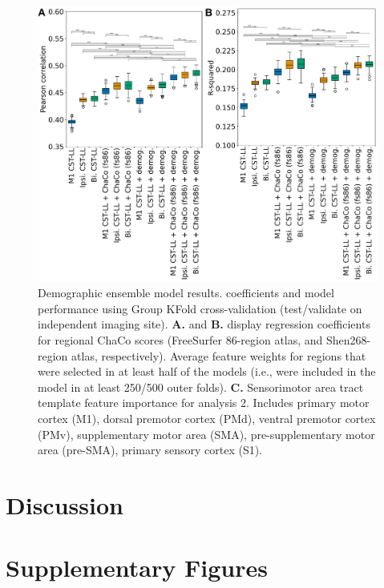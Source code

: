 \documentclass[10pt]{article}
\begin{document}
\begin{figure}[htp]
\centering
\includegraphics[width=1\linewidth]{figures/Analysis8.png}
\caption{Demographic ensemble model results. coefficients and model performance using Group KFold cross-validation (test/validate on independent imaging site). \textbf{A.} and \textbf{B.} display regression coefficients for regional ChaCo scores (FreeSurfer 86-region atlas, and Shen268-region atlas, respectively). Average feature weights for regions that were selected in at least half of the models (i.e., were included in the model in at least 250/500 outer folds). \textbf{C.} Sensorimotor area tract template feature importance for analysis 2. Includes primary motor cortex (M1), dorsal premotor cortex (PMd), ventral premotor cortex (PMv), supplementary motor area (SMA), pre-supplementary motor area (pre-SMA), primary sensory cortex (S1).}
\label{nemotool}
\end{figure}


\section{Discussion}

\clearpage

\newcommand{\beginsupplement}{%
\setcounter{table}{0}
\renewcommand{\thetable}{S\arabic{table}}%
\setcounter{figure}{0}
\renewcommand{\thefigure}{S\arabic{figure}}%
}

\printbibliography

\beginsupplement
\section*{Supplementary Figures}
\end{document}
